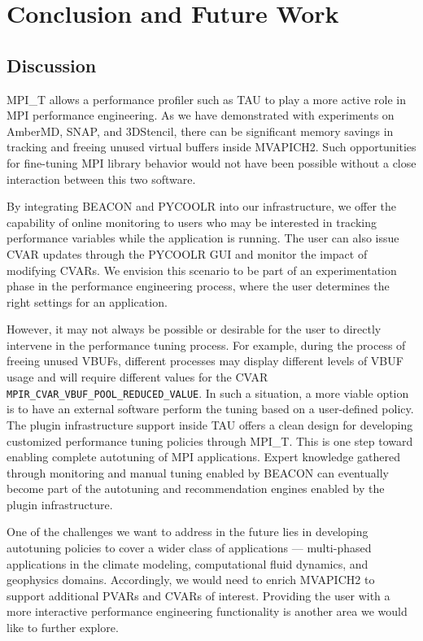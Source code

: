 \chapter{Conclusion and Future Work}
\section {Discussion}

MPI\_T allows a performance profiler such as TAU to play a more active role in MPI performance engineering. As we have demonstrated with experiments on AmberMD, SNAP, and 3DStencil, there can be significant memory savings in tracking and freeing unused virtual buffers inside MVAPICH2. Such opportunities for fine-tuning MPI library behavior would not have been possible without a close interaction between this two software.  \par
By integrating BEACON and PYCOOLR into our infrastructure, we offer the capability of online monitoring to users who may be interested in tracking performance variables while the application is running. The user can also issue CVAR updates through the PYCOOLR GUI and monitor the impact of modifying CVARs. We envision this scenario to be part of an experimentation phase in the performance engineering process, where the user determines the right settings for an application. \par
However, it may not always be possible or desirable for the user to directly intervene in the performance tuning process. For example, during the process of freeing unused VBUFs, different processes may display different levels of VBUF usage and will require different values for the CVAR \\ \verb+MPIR_CVAR_VBUF_POOL_REDUCED_VALUE+. In such a situation, a more viable option is to have an external software perform the tuning based on a user-defined policy. The plugin infrastructure support inside TAU offers a clean design for developing customized performance tuning policies through MPI\_T. This is one step toward enabling complete autotuning of MPI applications. Expert knowledge gathered through monitoring and manual tuning enabled by BEACON can eventually become part of the autotuning and recommendation engines enabled by the plugin infrastructure.  \par
One of the challenges we want to address in the future lies in developing autotuning policies to cover a wider class of applications --- multi-phased applications in the climate modeling, computational fluid dynamics, and geophysics domains. Accordingly, we would need to enrich MVAPICH2 to support additional PVARs and CVARs of interest. Providing the user with a more interactive performance engineering functionality is another area we would like to further explore.

